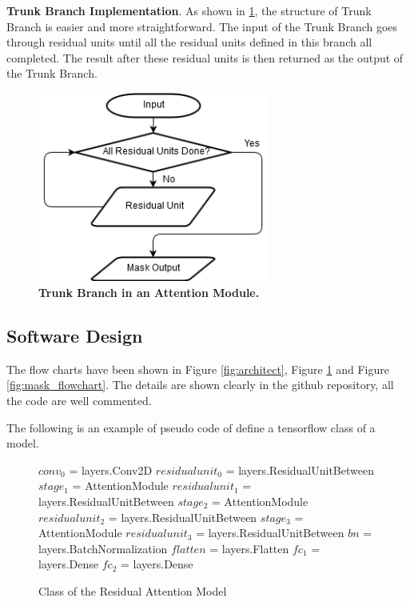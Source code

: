 \documentclass{article}
\newcommand{\mycaption}[2]{\caption[#1]{\textbf{#1.} #2}}
\begin{document}
\begin{multicols}{2}
\textbf{Trunk Branch Implementation}. As shown in \ref{fig:trunk_flowchart}, the structure of Trunk Branch is easier and more straightforward. The input of the Trunk Branch goes through residual units until all the residual units defined in this branch all completed. The result after these residual units is then returned as the output of the Trunk Branch.
\begin{figure}[H] 
\includegraphics[width=3in]{imgs/trunk_flowchart.png}  
\mycaption{Trunk Branch in an Attention Module}{}  
\label{fig:trunk_flowchart}
\end{figure}

\subsection{Software Design}
The flow charts have been shown in Figure \ref{fig:architect}, Figure \ref{fig:trunk_flowchart} and Figure \ref{fig:mask_flowchart}. The details are shown clearly in the github repository, all the code are well commented. 

The following is an example of pseudo code of define a tensorflow class of a model.

\begin{figure}[H]
\centering
\begin{minipage}{3in}
\begin{algorithm}[H]
\caption{Class of the Residual Attention Model}
	\begin{algorithmic}[1]
		\State $conv_0$ = layers.Conv2D
		\State $residualunit_0$ = layers.ResidualUnitBetween
		\State $stage_1$ = AttentionModule
		\State $residualunit_1$ = layers.ResidualUnitBetween
		\State $stage_2$ = AttentionModule
		\State $residualunit_2$ = layers.ResidualUnitBetween
		\State $stage_3$ = AttentionModule
		\State $residualunit_3$ = layers.ResidualUnitBetween
		\State $bn$ = layers.BatchNormalization
		\State $flatten$ = layers.Flatten
		\State $fc_1$ = layers.Dense
		\State $fc_2$ = layers.Dense
	\EndFunction
	

\end{algorithmic}
\end{algorithm}
\end{minipage}
\end{figure}
\end{multicols}
\end{document}
